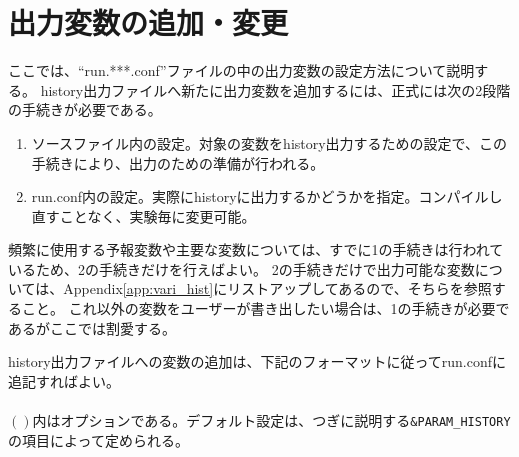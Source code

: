 

\section{出力変数の追加・変更}
ここでは、``run.***.conf''ファイルの中の出力変数の設定方法について説明する。
history出力ファイルへ新たに出力変数を追加するには、正式には次の2段階の手続きが必要である。
\begin{enumerate}
\item ソースファイル内の設定。対象の変数をhistory出力するための設定で、この手続きにより、出力のための準備が行われる。
\item run.conf内の設定。実際にhistoryに出力するかどうかを指定。コンパイルし直すことなく、実験毎に変更可能。
\end{enumerate}
頻繁に使用する予報変数や主要な変数については、すでに1の手続きは行われているため、2の手続きだけを行えばよい。
2の手続きだけで出力可能な変数については、Appendix\ref{app:vari_hist}にリストアップしてあるので、そちらを参照すること。
これ以外の変数をユーザーが書き出したい場合は、1の手続きが必要であるがここでは割愛する。


history出力ファイルへの変数の追加は、下記のフォーマットに従ってrun.confに追記すればよい。\\

{\small {\gt
{}}}\\

$\left( \right)$内はオプションである。デフォルト設定は、つぎに説明する\verb|&PARAM_HISTORY|の項目によって定められる。\\

